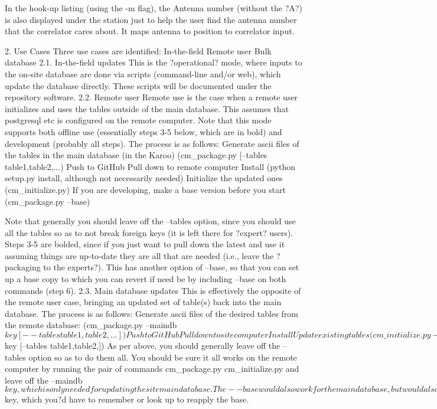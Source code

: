 \documentclass{article}
\begin{document}
In the hook-up listing (using the -m flag), the Antenna number (without the ?A?) is also displayed under the station just to help the user find the antenna number that the correlator cares about.  It maps antenna to position to correlator input.


2. Use Cases
Three use cases are identified:
In-the-field
Remote user
Bulk database
2.1. In-the-field updates
This is the ?operational? mode, where inputs to the on-site database are done via scripts (command-line and/or web), which update the database directly.  These scripts will be documented under the repository software.
2.2. Remote user
Remote use is the case when a remote user initializes and uses the tables outside of the main database.  This assumes that postgresql etc is configured on the remote computer.  Note that this mode supports both offline use (essentially steps 3-5 below, which are in bold) and development (probably all steps).  The process is as follows: 
Generate ascii files of the tables in the main database (in the Karoo)
      	(cm\_package.py [--tables table1,table2,...)
Push to GitHub
Pull down to remote computer
Install (python setup.py install, although not necessarily needed)
Initialize the updated ones (cm\_initialize.py)
If you are developing, make a base version before you start
(cm\_package.py --base)

Note that generally you should leave off the --tables option, since you should use all the tables so as to not break foreign keys (it is left there for ?expert? users).  Steps 3-5 are bolded, since if you just want to pull down the latest and use it assuming things are up-to-date they are all that are needed (i.e., leave the ?packaging to the experts?).
	This has another option of --base, so that you can set up a base copy to which you can revert if need be by including --base on both commands (step 6).
2.3. Main database updates
This is effectively the opposite of the remote user case, bringing an updated set of table(s) back into the main database.  The process is as follows:
Generate ascii files of the desired tables from the remote database: 
(cm\_package.py --maindb $key [--tables table1,table2,...])
Push to GitHub
Pull down to site computer
Install
Update existing tables 
(cm\_initialize.py --maindb $key [--tables table1,table2,])
As per above, you should generally leave off the --tables option so as to do them all.  You should be sure it all works on the remote computer by running the pair of commands
cm\_package.py
cm\_initialize.py 
and leave off the --maindb $key, which is only needed for updating the site main database.  The --base would also work for the main database, but would also require --maindb $key, which you?d have to remember or look up to reapply the base.
\end{document}
